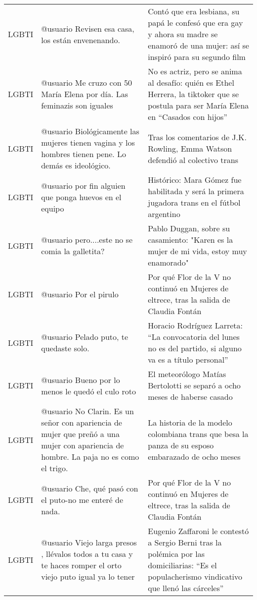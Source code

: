 \begin{table}
\begin{tabular}{p{} p{} p{}}
                 LGBTI & @usuario Revisen esa casa, los están envenenando. & Contó que era lesbiana, su papá le confesó que era gay y ahora su madre se enamoró de una mujer: así se inspiró para su segundo film \\
                 LGBTI & @usuario Me cruzo con 50 María Elena por día. Las feminazis son iguales & No es actriz, pero se anima al desafío: quién es Ethel Herrera, la tiktoker que se postula para ser María Elena en “Casados con hijos” \\
                 LGBTI & @usuario Biológicamente las mujeres tienen vagina y los hombres tienen pene. Lo demás es ideológico. & Tras los comentarios de J.K. Rowling, Emma Watson defendió al colectivo trans \\
                 LGBTI & @usuario por fin alguien que ponga huevos en el equipo & Histórico: Mara Gómez fue habilitada y será la primera jugadora trans en el fútbol argentino \\
                 LGBTI & @usuario pero....este no se comia la galletita? & Pablo Duggan, sobre su casamiento: "Karen es la mujer de mi vida, estoy muy enamorado" \\
                 LGBTI & @usuario Por el pirulo & Por qué Flor de la V no continuó en Mujeres de eltrece, tras la salida de Claudia Fontán \\
                 LGBTI & @usuario Pelado puto, te quedaste solo. & Horacio Rodríguez Larreta: “La convocatoria del lunes no es del partido, si alguno va es a título personal” \\
                 LGBTI & @usuario Bueno por lo menos le quedó el culo roto & El meteorólogo Matías Bertolotti se separó a ocho meses de haberse casado \\
                 LGBTI & @usuario No Clarin. Es un señor con apariencia de mujer que preñó a una mujer con apariencia de hombre. La paja no es como el trigo. & La historia de la modelo colombiana trans que besa la panza de su esposo embarazado de ocho meses \\
                 LGBTI & @usuario Che, qué pasó con el puto-no me enteré de nada. & Por qué Flor de la V no continuó en Mujeres de eltrece, tras la salida de Claudia Fontán \\
                 LGBTI & @usuario Viejo larga presos , llévalos todos a tu casa y te haces romper el orto viejo puto igual ya lo tener & Eugenio Zaffaroni le contestó a Sergio Berni tras la polémica por las domiciliarias: “Es el populacherismo vindicativo que llenó las cárceles” \\

\end{tabular}
\end{table}
